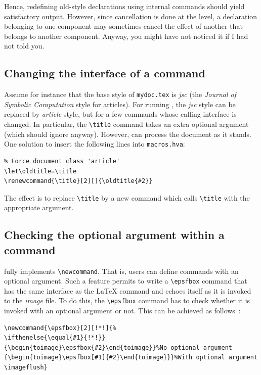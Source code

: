 Hence, redefining old-style declarations using internal commands
should yield satisfactory output.
However, since cancellation is done at the \html{}
level, a declaration belonging to one component may sometimes cancel the
effect of another that belongs to another component.
Anyway, you might have not noticed it if I had not told you.

\subsection{Changing the interface of a command}\label{customize-let}
Assume for instance that the base style of \texttt{mydoc.tex} is
\textit{jsc} (the
\emph{Journal of Symbolic Computation} style for articles).
For running \hevea{}, the \textit{jsc} style can be replaced by
\textit{article}
style, but for a few commands whose calling interface is changed.
In particular, the \verb+\title+ command
takes an extra optional argument (which \hevea{} should ignore
anyway).
However, \hevea{} can process the document as it stands.
One  solution to insert the following lines into \texttt{macros.hva}:
\begin{verbatim}
% Force document class 'article'
\let\oldtitle=\title
\renewcommand{\title}[2][]{\oldtitle{#2}}
\end{verbatim}
The effect is to replace \verb+\title+ by a new command which
calls \hevea{} \verb+\title+ with the appropriate argument.
\subsection{Checking the optional argument within a command}\label{fullepsfbox}
\hevea{} fully implements \LaTeXe{} \verb+\newcommand+.
That is, users can define commands with an optional argument.
Such a feature permits to write a \verb+\epsfbox+ command that
has the same interface as the \LaTeX{} command and
echoes itself as it is invoked to the \textit{image} file.
To do this, the \hevea{} \verb+\epsfbox+ command has to check
whether it is invoked with an optional argument or not.
This can be achieved as follows~:
\begin{verbatim}
\newcommand{\epsfbox}[2][!*!]{%
\ifthenelse{\equal{#1}{!*!}}
{\begin{toimage}\epsfbox{#2}\end{toimage}}%No optional argument
{\begin{toimage}\epsfbox[#1]{#2}\end{toimage}}}%With optional argument
\imageflush}
\end{verbatim}

